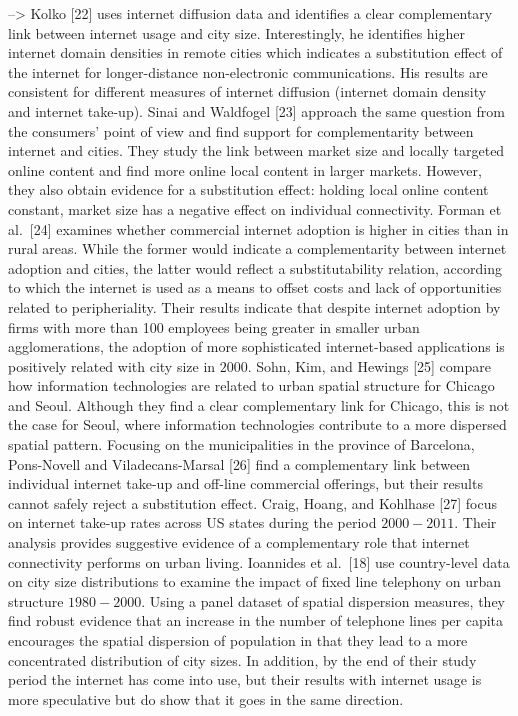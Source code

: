 \documentclass[10pt,letterpaper]{article}
\begin{document}
--\textgreater{} Kolko {[}22{]} uses internet diffusion data and
identifies a clear complementary link between internet usage and city
size. Interestingly, he identifies higher internet domain densities in
remote cities which indicates a substitution effect of the internet for
longer-distance non-electronic communications. His results are
consistent for different measures of internet diffusion (internet domain
density and internet take-up). Sinai and Waldfogel {[}23{]} approach the
same question from the consumers' point of view and find support for
complementarity between internet and cities. They study the link between
market size and locally targeted online content and find more online
local content in larger markets. However, they also obtain evidence for
a substitution effect: holding local online content constant, market
size has a negative effect on individual connectivity. Forman et
al.~{[}24{]} examines whether commercial internet adoption is higher in
cities than in rural areas. While the former would indicate a
complementarity between internet adoption and cities, the latter would
reflect a substitutability relation, according to which the internet is
used as a means to offset costs and lack of opportunities related to
peripheriality. Their results indicate that despite internet adoption by
firms with more than 100 employees being greater in smaller urban
agglomerations, the adoption of more sophisticated internet-based
applications is positively related with city size in \(2000\). Sohn,
Kim, and Hewings {[}25{]} compare how information technologies are
related to urban spatial structure for Chicago and Seoul. Although they
find a clear complementary link for Chicago, this is not the case for
Seoul, where information technologies contribute to a more dispersed
spatial pattern. Focusing on the municipalities in the province of
Barcelona, Pons-Novell and Viladecans-Marsal {[}26{]} find a
complementary link between individual internet take-up and off-line
commercial offerings, but their results cannot safely reject a
substitution effect. Craig, Hoang, and Kohlhase {[}27{]} focus on
internet take-up rates across US states during the period \(2000-2011\).
Their analysis provides suggestive evidence of a complementary role that
internet connectivity performs on urban living. Ioannides et
al.~{[}18{]} use country-level data on city size distributions to
examine the impact of fixed line telephony on urban structure
\(1980-2000\). Using a panel dataset of spatial dispersion measures,
they find robust evidence that an increase in the number of telephone
lines per capita encourages the spatial dispersion of population in that
they lead to a more concentrated distribution of city sizes. In
addition, by the end of their study period the internet has come into
use, but their results with internet usage is more speculative but do
show that it goes in the same direction.
\end{document}
